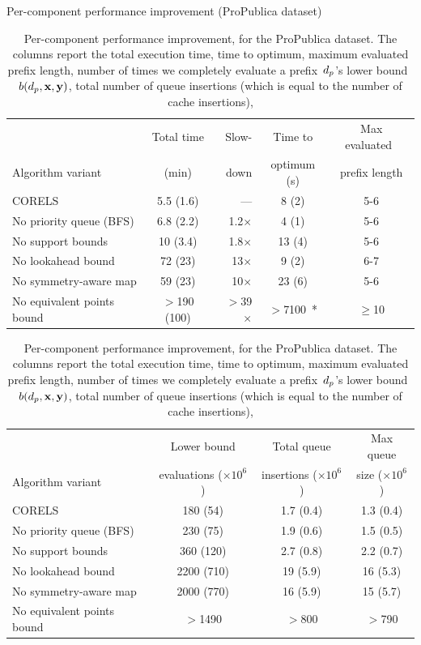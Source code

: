 \begin{table}[t!]
\begin{centering}
Per-component performance improvement (ProPublica dataset) \\
\end{centering}
\vspace{1mm}
\begin{tabular}{l | c  r | c | c}
& Total time & Slow- & Time to & Max evaluated~ \\
Algorithm variant & (min) & down & optimum (s) & prefix length \\
\hline
CORELS & 5.5 (1.6) & --- & 8 (2) & 5-6 \\
No priority queue (BFS) & 6.8 (2.2) & 1.2$\times$ & 4 (1) & 5-6 \\
No support bounds & 10 (3.4) & 1.8$\times$ & 13 (4) & 5-6 \\
No lookahead bound & 72 (23) & 13$\times$ & 9 (2) & 6-7 \\
No symmetry-aware map & 59 (23) & 10$\times$ & 23 (6) & 5-6 \\
No equivalent points bound & $>$190 (100) & $>$39$\times$ & $>$7100~* & $\ge$10 \\
\hline
\end{tabular}
\begin{tabular}{l | c | c | c}
\hline
 & Lower bound & Total queue &  Max queue \\
Algorithm variant & evaluations ($\times 10^6$) & insertions ($\times 10^6$) & size ($\times 10^6$) \\
\hline
CORELS & 180 (54) & 1.7 (0.4) & 1.3 (0.4) \\
No priority queue (BFS) & 230 (75) & 1.9 (0.6) & 1.5 (0.5) \\
No support bounds & 360 (120) & 2.7 (0.8) & 2.2 (0.7) \\
No lookahead bound & 2200 (710) & 19 (5.9) & 16 (5.3) \\
No symmetry-aware map & 2000 (770) & 16 (5.9) & 15 (5.7) \\
No equivalent points bound & $>$1490 & $>$800 & $>$790 \\
\end{tabular}
\caption{Per-component performance improvement, for the ProPublica dataset.
%
The columns report the total execution time,
time to optimum, maximum evaluated prefix length,
number of times we completely evaluate a prefix~$d_p$'s lower bound~$b(d_p, \mathbf{x}, \mathbf{y})$,
total number of queue insertions (which is equal to the number of cache insertions),
}
\end{table}
